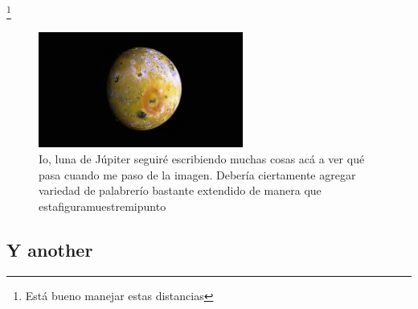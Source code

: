 \lipsum[6] \footnote{Está bueno manejar estas distancias}

\begin{figure}[htb]
    \centering
    \includegraphics[width=0.6\textwidth]{img/giant-volcano-on-io-volcanic-moon-of-jupiter-expected-to-erupt.jpg}
    \caption{Io, luna de Júpiter seguiré escribiendo muchas cosas acá a ver qué pasa cuando me paso de la imagen. Debería ciertamente agregar variedad de palabrerío bastante extendido de manera que estafiguramuestremipunto}
    \label{fig:my_label}
\end{figure}

\lipsum[7]

\subsection{Y another}

\lipsum[8]